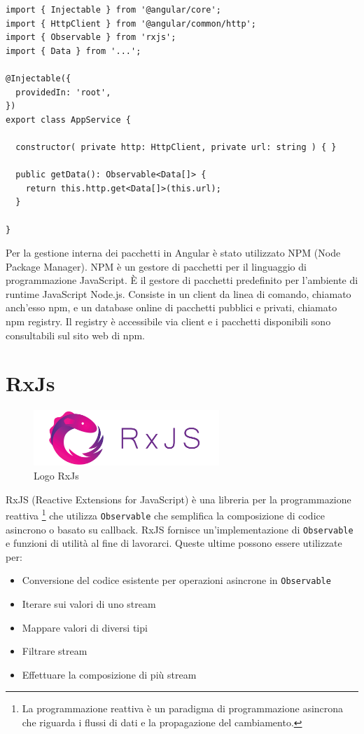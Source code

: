 \begin{lstlisting}[caption={Esempio di un Service in Angular}, style=javaScriptCode]
import { Injectable } from '@angular/core';
import { HttpClient } from '@angular/common/http';
import { Observable } from 'rxjs';
import { Data } from '...';

@Injectable({
  providedIn: 'root',
})
export class AppService {

  constructor( private http: HttpClient, private url: string ) { }
  
  public getData(): Observable<Data[]> {
    return this.http.get<Data[]>(this.url);
  }

}
\end{lstlisting}
Per la gestione interna dei pacchetti in Angular è stato utilizzato NPM (Node Package Manager). NPM è un gestore di pacchetti per il linguaggio di programmazione JavaScript. È il gestore di pacchetti predefinito per l'ambiente di runtime JavaScript Node.js. Consiste in un client da linea di comando, chiamato anch'esso npm, e un database online di pacchetti pubblici e privati, chiamato npm registry.
Il registry è accessibile via client e i pacchetti disponibili sono consultabili sul sito web di npm. \cite{NPM}

\section{RxJs}
\begin{figure}[h!]
\begin{center}
  \includegraphics[width=7cm]{images/RxJs.png}
  \caption{Logo RxJs}
\end{center}
\end{figure}
RxJS (Reactive Extensions for JavaScript) è una libreria per la programmazione reattiva \footnote{La programmazione reattiva è un paradigma di programmazione asincrona che riguarda i flussi di dati e la propagazione del cambiamento.} che utilizza \verb|Observable| che semplifica la composizione di codice asincrono o basato su callback. RxJS fornisce un'implementazione di \verb|Observable| e funzioni di utilità al fine di lavorarci\cite{RxJS}. Queste ultime possono essere utilizzate per:
\begin{itemize}
    \item Conversione del codice esistente per operazioni asincrone in        \verb|Observable|
    \item Iterare sui valori di uno stream
    \item Mappare valori di diversi tipi
    \item Filtrare stream
    \item Effettuare la composizione di più stream
\end{itemize}

